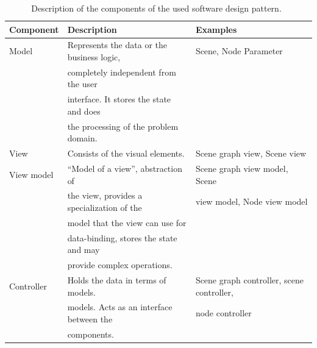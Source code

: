 \documentclass[%
    a4paper,    %
    justified,  %
    nobib,      %
    openany     %
]{tufte-book}
\begin{document}
\begin{table}[h]
  \begin{tabularx}{\textwidth}{llX}
    \toprule
    \textbf{Component} & \textbf{Description} & \textbf{Examples} \\
    \midrule
    Model      & Represents the data or the business logic, & Scene, Node
                                                              Parameter\\
               & completely independent from the user       & \\
               & interface. It stores the state and does    & \\
               & the processing of the problem domain.      & \\
    \midrule
    View       & Consists of the visual elements.           & Scene graph view,
                                                              Scene view\\
    \midrule
    View model & \enquote{Model of a view}, abstraction of  & Scene graph view
                                                              model, Scene\\
               & the view, provides a specialization of the & view model, Node
                                                              view model\\
               & model that the view can use for            & \\
               & data-binding, stores the state and may     & \\
               & provide complex operations.                & \\
    \midrule
    Controller & Holds the data in terms of models.         & Scene graph
                                                              controller, scene
                                                              controller,\\
               & models. Acts as an interface between the   & node controller\\
               & components.                                & \\
    \bottomrule
  \end{tabularx}
  \caption{Description of the components of the used software design
    pattern.~\cite{fowler-presentation-2004, gossman-mvvm-2005}}
  \label{table:software-design-pattern-components}
\end{table}
\end{document}
